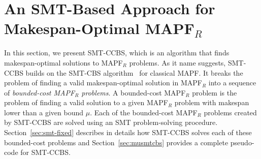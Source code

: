\documentclass[review]{elsarticle}
\newcommand{\history}{past-conflicts\xspace}
\newcommand{\smt}{\ac{SMT}\xspace}
\newcommand{\ccbs}{\ac{CCBS}\xspace}
\newcommand{\cbs}{\ac{CBS}\xspace}
\newcommand{\mapfr}{\ac{MAPF}$_R$\xspace}
\newcommand{\mddsat}{MDD-SAT\xspace}
\newcommand{\smtcbsO}{SMT-CBS\xspace} %
\newcommand{\smtccbs}{SMT-CCBS\xspace}
\newcommand{\mapf}{\ac{MAPF}\xspace}
\begin{document}


\section{An SMT-Based Approach for Makespan-Optimal \mapfr}
\label{sec:smtccbs}




In this section, we present \smtccbs, which is an algorithm that  finds makespan-optimal solutions to \mapfr problems. 
As it name suggests, \smtccbs builds on the \smtcbsO algorithm~\cite{DBLP:conf/ijcai/Surynek19} for classical \mapf . 
It breaks the problem of finding a valid makespan-optimal solution in \mapfr into a sequence of \emph{bounded-cost \mapfr problems}. 
A bounded-cost \mapfr problem is the problem of finding a valid solution to a given \mapfr problem with makespan lower than a given bound $\mu$. 
Each of the bounded-cost \mapfr problems created by \smtccbs are solved using an \smt problem-solving procedure. 
Section~\ref{sec:smt-fixed} describes in details how \smtccbs solves each of these bounded-cost problems 
and Section~\ref{sec:musmtcbs} provides a complete pseudo-code for \smtccbs. 
\end{document}
